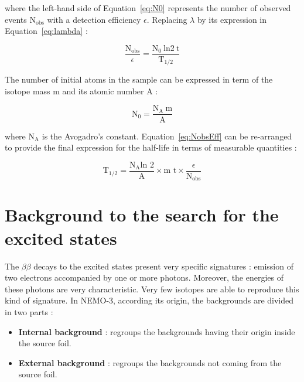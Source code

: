 \documentclass[main.tex]{subfiles}
\begin{document}
\bigskip


\NI where the left-hand side of Equation~\ref{eq:N0} represents the number of observed events N$_{\text{obs}}$ with a detection efficiency $\epsilon$. Replacing $\lambda$ by its expression in Equation~\ref{eq:lambda} : 

\begin{equation}\label{eq:NobsEff}
\frac{\text{N}_{\text{obs}}}{\epsilon} = \frac{\text{N}_\text{0}~\text{ln2}~\text{t}}{\text{T}_{\text{1/2}}}
\end{equation}


\bigskip


\NI The number of initial atoms in the sample can be expressed in term of the isotope mass m and its atomic number A : 


\begin{equation}
\text{N}_\text{0} = \frac{\text{N}_\text{A}~\text{m}}{\text{A}}
\end{equation}


\bigskip


\NI where $\text{N}_\text{A}$ is the Avogadro's constant. Equation~\ref{eq:NobsEff} can be re-arranged to provide the final expression for the half-life in terms of measurable quantities : 

\begin{equation}
\text{T}_{\text{1/2}} = \frac{\text{N}_\text{A} \text{ln 2}}{\text{A}} \times \text{m t} \times \frac{\epsilon}{\text{N}_{\text{obs}}}
\end{equation}



\section{Background to the search for the excited states}\label{sec:BKGexcitedStates}


\NI The $\beta \beta$ decays to the excited states present very specific signatures : emission of two electrons accompanied by one or more photons. Moreover, the energies of these photons are very characteristic. Very few isotopes are able to reproduce this kind of signature. In NEMO-3, according its origin, the backgrounds are divided in two parts : 


\begin{itemize}
\item \textbf{Internal background} : regroups the backgrounds having their origin inside the source foil.
\item \textbf{External background} : regroups the backgrounds not coming from the source foil.
\end{itemize}
\end{document}
